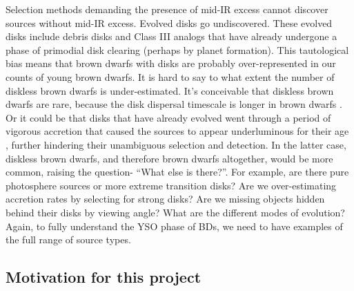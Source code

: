 \documentclass[12pt,preprint]{aastex}
\begin{document}
Selection methods demanding the presence of mid-IR excess cannot discover sources without mid-IR excess.  Evolved disks go undiscovered.  These evolved disks include debris disks and Class III analogs that have already undergone a phase of primodial disk clearing (perhaps by planet formation).  This tautological bias means that brown dwarfs with disks are probably over-represented in our counts of young brown dwarfs.  It is hard to say to what extent the number of diskless brown dwarfs is under-estimated.  It's conceivable that diskless brown dwarfs are rare, because the disk dispersal timescale is longer in brown dwarfs \citep{2008ApJ...681.1584R}.  Or it could be that disks that have already evolved went through a period of vigorous accretion that caused the sources to appear underluminous for their age \citep{2009ApJ...702L..27B}, further hindering their unambiguous selection and detection.  In the latter case, diskless brown dwarfs, and therefore brown dwarfs altogether, would be more common, raising the question- ``What else is there?''.  For example, are there pure photosphere sources or more extreme transition disks?  Are we over-estimating accretion rates by selecting for strong disks?  Are we missing objects hidden behind their disks by viewing angle?  What are the different modes of evolution?  Again, to fully understand the YSO phase of BDs, we need to have examples of the full range of source types. 


\subsection{Motivation for this project}
\end{document}
